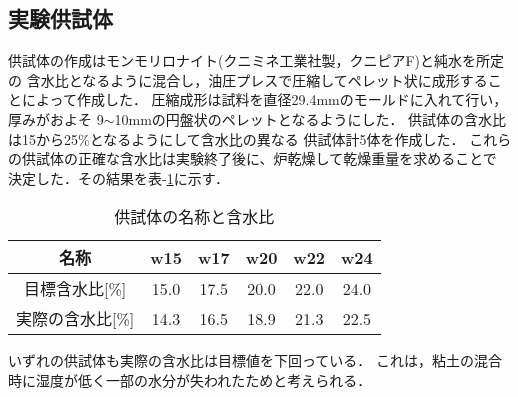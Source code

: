 \documentclass{jsce}
\begin{document}
\subsection{実験供試体}
供試体の作成はモンモリロナイト(クニミネ工業社製，クニピアF)と純水を所定の
含水比となるように混合し，油圧プレスで圧縮してペレット状に成形することによって作成した．
圧縮成形は試料を直径29.4mmのモールドに入れて行い，厚みがおよそ
9$\sim$10mmの円盤状のペレットとなるようにした．
供試体の含水比は15から25$\%$となるようにして含水比の異なる
供試体計5体を作成した．
これらの供試体の正確な含水比は実験終了後に、炉乾燥して乾燥重量を求めることで
決定した．その結果を表-\ref{tbl:samples}に示す．
\begin{table}[h]
\begin{center}
\caption{供試体の名称と含水比}
	\label{tbl:samples}
\begin{tabular}{c||c|c|c|c|c}
\hline
	名称 & w15 & w17 & w20 & w22 & w24 \\
\hline
\hline
	目標含水比[\%] & 15.0 & 17.5 & 20.0 & 22.0 & 24.0 \\
\hline
	実際の含水比[\%] &  14.3 & 16.5 & 18.9 & 21.3 & 22.5  \\
\hline 
\end{tabular}
\end{center}
\end{table}
いずれの供試体も実際の含水比は目標値を下回っている．
これは，粘土の混合時に湿度が低く一部の水分が失われたためと考えられる．
\end{document}
